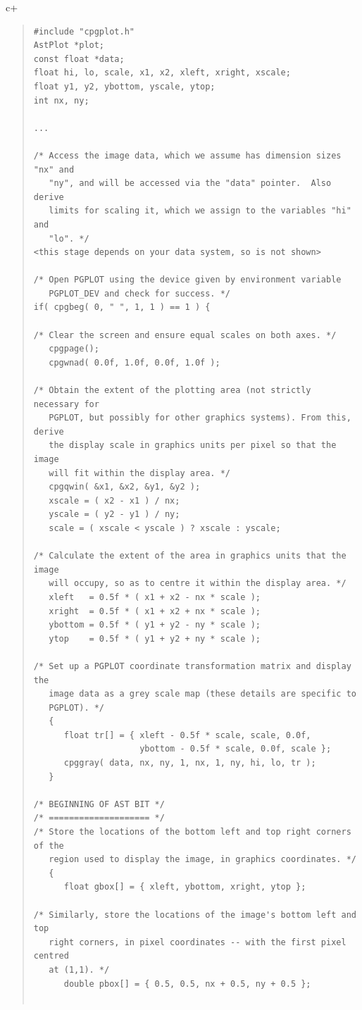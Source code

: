 \documentclass[twoside,11pt]{article}
\begin{document}
c+
\begin{quote}
\small
\begin{verbatim}
#include "cpgplot.h"
AstPlot *plot;
const float *data;
float hi, lo, scale, x1, x2, xleft, xright, xscale;
float y1, y2, ybottom, yscale, ytop;
int nx, ny;

...

/* Access the image data, which we assume has dimension sizes "nx" and
   "ny", and will be accessed via the "data" pointer.  Also derive
   limits for scaling it, which we assign to the variables "hi" and
   "lo". */
<this stage depends on your data system, so is not shown>

/* Open PGPLOT using the device given by environment variable
   PGPLOT_DEV and check for success. */
if( cpgbeg( 0, " ", 1, 1 ) == 1 ) {

/* Clear the screen and ensure equal scales on both axes. */
   cpgpage();
   cpgwnad( 0.0f, 1.0f, 0.0f, 1.0f );

/* Obtain the extent of the plotting area (not strictly necessary for
   PGPLOT, but possibly for other graphics systems). From this, derive
   the display scale in graphics units per pixel so that the image
   will fit within the display area. */
   cpgqwin( &x1, &x2, &y1, &y2 );
   xscale = ( x2 - x1 ) / nx;
   yscale = ( y2 - y1 ) / ny;
   scale = ( xscale < yscale ) ? xscale : yscale;

/* Calculate the extent of the area in graphics units that the image
   will occupy, so as to centre it within the display area. */
   xleft   = 0.5f * ( x1 + x2 - nx * scale );
   xright  = 0.5f * ( x1 + x2 + nx * scale );
   ybottom = 0.5f * ( y1 + y2 - ny * scale );
   ytop    = 0.5f * ( y1 + y2 + ny * scale );

/* Set up a PGPLOT coordinate transformation matrix and display the
   image data as a grey scale map (these details are specific to
   PGPLOT). */
   {
      float tr[] = { xleft - 0.5f * scale, scale, 0.0f,
                     ybottom - 0.5f * scale, 0.0f, scale };
      cpggray( data, nx, ny, 1, nx, 1, ny, hi, lo, tr );
   }

/* BEGINNING OF AST BIT */
/* ==================== */
/* Store the locations of the bottom left and top right corners of the
   region used to display the image, in graphics coordinates. */
   {
      float gbox[] = { xleft, ybottom, xright, ytop };

/* Similarly, store the locations of the image's bottom left and top
   right corners, in pixel coordinates -- with the first pixel centred
   at (1,1). */
      double pbox[] = { 0.5, 0.5, nx + 0.5, ny + 0.5 };


\end{verbatim}
\end{quote}
\end{document}
